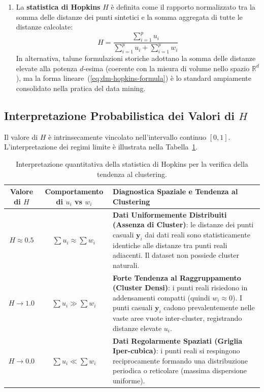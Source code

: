 \begin{enumerate}
    \item La \textbf{statistica di Hopkins} $H$ è definita come il rapporto normalizzato tra la somma delle distanze dei punti sintetici e la somma aggregata di tutte le distanze calcolate:
    \begin{equation}
    \label{eq:dm-hopkins-formula}
    H = \frac{\sum_{i=1}^p u_i}{\sum_{i=1}^p u_i + \sum_{i=1}^p w_i}
    \end{equation}
    In alternativa, talune formulazioni storiche adottano la somma delle distanze elevate alla potenza $d$-esima (coerente con la misura di volume nello spazio $\mathbb{R}^d$), ma la forma lineare~(\ref{eq:dm-hopkins-formula}) è lo standard ampiamente consolidato nella pratica del data mining.
\end{enumerate}

\FloatBarrier
\subsection{Interpretazione Probabilistica dei Valori di $H$}
Il valore di $H$ è intrinsecamente vincolato nell'intervallo continuo $[0, 1]$. L'interpretazione dei regimi limite è illustrata nella Tabella~\ref{tab:dm-hopkins-interpretation}.

\begin{table}[H]
\centering
\small
\renewcommand{\arraystretch}{1.25}
\begin{tabularx}{\textwidth}{c c X}
\toprule
\textbf{Valore di $H$} & \textbf{Comportamento di $u_i$ vs $w_i$} & \textbf{Diagnostica Spaziale e Tendenza al Clustering} \\
\midrule
$H \approx 0.5$ & $\sum u_i \approx \sum w_i$ & \textbf{Dati Uniformemente Distribuiti (Assenza di Cluster)}: le distanze dei punti casuali $\mathbf{y}_i$ dai dati reali sono statisticamente identiche alle distanze tra punti reali adiacenti. Il dataset non possiede cluster naturali. \\
\addlinespace
$H \to 1.0$ & $\sum u_i \gg \sum w_i$ & \textbf{Forte Tendenza al Raggruppamento (Cluster Densi)}: i punti reali risiedono in addensamenti compatti (quindi $w_i \approx 0$). I punti casuali $\mathbf{y}_i$ cadono prevalentemente nelle vaste aree vuote inter-cluster, registrando distanze elevate $u_i$. \\
\addlinespace
$H \to 0.0$ & $\sum u_i \ll \sum w_i$ & \textbf{Dati Regolarmente Spaziati (Griglia Iper-cubica)}: i punti reali si respingono reciprocamente formando una distribuzione periodica o reticolare (massima dispersione uniforme). \\
\bottomrule
\end{tabularx}
\caption{Interpretazione quantitativa della statistica di Hopkins per la verifica della tendenza al clustering.}
\label{tab:dm-hopkins-interpretation}
\end{table}

